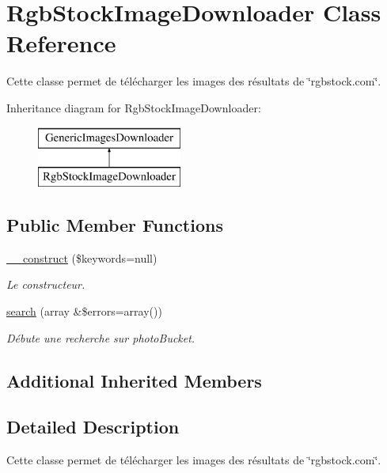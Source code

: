 \hypertarget{class_rgb_stock_image_downloader}{\section{Rgb\-Stock\-Image\-Downloader Class Reference}
\label{class_rgb_stock_image_downloader}
}


Cette classe permet de télécharger les images des résultats de \char`\"{}rgbstock.\-com\char`\"{}.  


Inheritance diagram for Rgb\-Stock\-Image\-Downloader\-:\begin{figure}[H]
\begin{center}
\leavevmode
\includegraphics[height=2.000000cm]{class_rgb_stock_image_downloader}
\end{center}
\end{figure}
\subsection*{Public Member Functions}
\begin{DoxyCompactItemize}
\item 
\hyperlink{class_rgb_stock_image_downloader_af7a671cb2bc664328fb5224f0da6ef60}{\-\_\-\-\_\-construct} (\$keywords=null)
\begin{DoxyCompactList}\small\item\em Le constructeur. \end{DoxyCompactList}\item 
\hyperlink{class_rgb_stock_image_downloader_aeaf78020730e78dd35d16d14b527b44c}{search} (array \&\$errors=array())
\begin{DoxyCompactList}\small\item\em Débute une recherche sur photo\-Bucket. \end{DoxyCompactList}\end{DoxyCompactItemize}
\subsection*{Additional Inherited Members}


\subsection{Detailed Description}
Cette classe permet de télécharger les images des résultats de \char`\"{}rgbstock.\-com\char`\"{}. 

